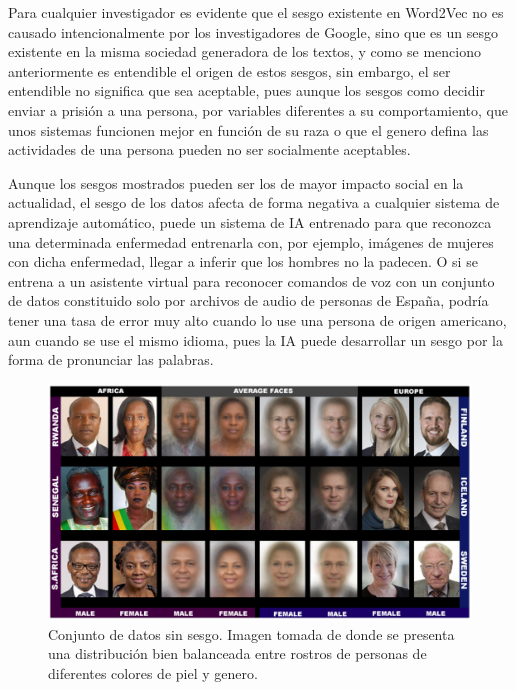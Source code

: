         Para cualquier investigador es evidente que el sesgo existente en Word2Vec no es causado intencionalmente por los investigadores de Google, sino que es un sesgo existente en la misma sociedad generadora de los textos, y como se menciono anteriormente es entendible el origen de estos sesgos, sin embargo, el ser entendible no significa que sea aceptable, pues aunque los sesgos como decidir enviar a prisión a una persona, por variables diferentes a su comportamiento, que unos sistemas funcionen mejor en función de su raza o que el genero defina las actividades de una persona pueden no ser socialmente aceptables.
        
        Aunque los sesgos mostrados pueden ser los de mayor impacto social en la actualidad, el sesgo de los datos afecta de forma negativa a cualquier sistema de aprendizaje automático, puede un sistema de IA entrenado para que reconozca una determinada enfermedad entrenarla con, por ejemplo, imágenes de mujeres con dicha enfermedad, llegar a inferir que los hombres no la padecen. O si se entrena a un asistente virtual para reconocer comandos de voz con un conjunto de datos constituido solo por archivos de audio de personas de España, podría tener una tasa de error muy alto cuando lo use una persona de origen americano, aun cuando se use el mismo idioma, pues la IA puede desarrollar un sesgo por la forma de pronunciar las palabras.
        
        \begin{figure}[ht!]
        	\centering
        	\includegraphics[width=0.8\linewidth]{imgs/02-Referential/02-dataset-no-bias.png}
        	\caption[Conjunto de datos sin sesgo.]{Conjunto de datos sin sesgo. Imagen tomada de \cite{Buolamwini2018Sesgo} donde se presenta una distribución bien balanceada entre rostros de personas de diferentes colores de piel y genero.}
    	    \label{fig:DatasetNoBias}
        \end{figure}%
        
